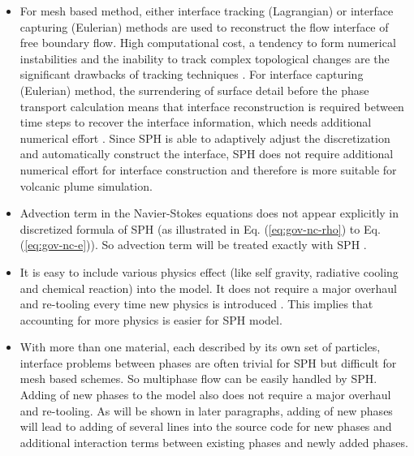 \documentclass[journal abbreviation, manuscript]{copernicus}
\begin{document}
\begin{itemize}
\item For mesh based method, either interface tracking (Lagrangian) \citep{harlow1965numerical, wrobel1991computational, cheng1995simplified} or interface capturing (Eulerian) \citep{hirt1981volume, youngs1982time, gerlach2006comparison, gopala2008volume} methods are used to reconstruct the flow interface of free boundary flow. High computational cost, a tendency to form numerical instabilities and the inability to track complex topological changes are the significant drawbacks of tracking techniques \citep{hirt1981volume, unverdi1992front, anderson1998diffuse}. For interface capturing (Eulerian) method, the surrendering of surface detail before the phase transport calculation means that interface reconstruction is required between time steps to recover the interface information, which needs additional numerical effort \citep{hirt1981volume, youngs1982time}. Since SPH is able to adaptively adjust the discretization and automatically construct the interface, SPH does not require additional numerical effort for interface construction and therefore is more suitable for volcanic plume simulation.
\item Advection term in the Navier-Stokes equations does not appear explicitly in discretized formula of SPH (as illustrated in Eq. (\ref{eq:gov-nc-rho}) to Eq. (\ref{eq:gov-nc-e})). So advection term will be treated exactly with SPH \citep{monaghan2005smoothed}.
\item It is easy to include various physics effect (like self gravity, radiative cooling and chemical reaction) into the model. It does not require a major overhaul and re-tooling every time new physics is introduced \citep{monaghan1995sph}. This implies that accounting for more physics is easier for SPH model.
\item With more than one material, each described by its own set of particles, interface problems between phases are often trivial for SPH but difficult for mesh based schemes. So multiphase flow can be easily handled by SPH. Adding of new phases to the model also does not require a major overhaul and re-tooling. As will be shown in later paragraphs, adding of new phases will lead to adding of several lines into the source code for new phases and additional interaction terms between existing phases and newly added phases.
\end{itemize}
\end{document}
